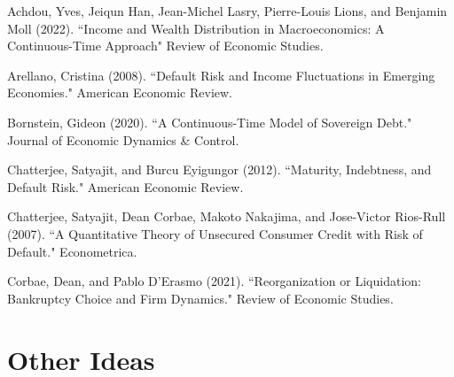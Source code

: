 \documentclass{article}
\begin{document}
Achdou, Yves, Jeiqun Han, Jean-Michel Lasry, Pierre-Louis Lions, and Benjamin Moll (2022). ``Income and Wealth Distribution in Macroeconomics: A Continuous-Time Approach" Review of Economic Studies.

\smallskip

Arellano, Cristina (2008). ``Default Risk and Income Fluctuations in Emerging Economies." American Economic Review.

\smallskip

Bornstein, Gideon (2020). ``A Continuous-Time Model of Sovereign Debt." Journal of Economic Dynamics \& Control.

\smallskip

Chatterjee, Satyajit, and Burcu Eyigungor (2012). ``Maturity, Indebtness, and Default Risk." American Economic Review.

\smallskip

Chatterjee, Satyajit, Dean Corbae, Makoto Nakajima, and Jose-Victor Rios-Rull (2007). ``A Quantitative Theory of Unsecured Consumer Credit with Risk of Default." Econometrica.

\smallskip

Corbae, Dean, and Pablo D'Erasmo (2021). ``Reorganization or Liquidation: Bankruptcy Choice and Firm Dynamics." Review of Economic Studies. 

\section*{Other Ideas}
\end{document}
